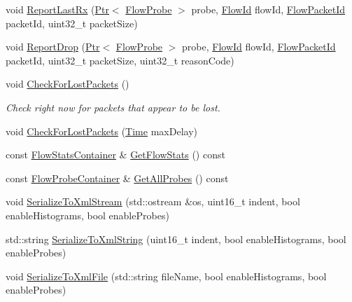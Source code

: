 \begin{DoxyCompactItemize}
\item 
void \hyperlink{classns3_1_1FlowMonitor_a534535fd498067cae4f774ba701e5d47}{Report\+Last\+Rx} (\hyperlink{classns3_1_1Ptr}{Ptr}$<$ \hyperlink{classns3_1_1FlowProbe}{Flow\+Probe} $>$ probe, \hyperlink{group__flow-monitor_ga39a766c4a370cdb9ab8ac85da4b288e9}{Flow\+Id} flow\+Id, \hyperlink{group__flow-monitor_gaa1cb18250e1672975204f1254b8aa2ae}{Flow\+Packet\+Id} packet\+Id, uint32\+\_\+t packet\+Size)
\item 
void \hyperlink{classns3_1_1FlowMonitor_af14d59ab4f3cc4f2b27601fca54cb7dd}{Report\+Drop} (\hyperlink{classns3_1_1Ptr}{Ptr}$<$ \hyperlink{classns3_1_1FlowProbe}{Flow\+Probe} $>$ probe, \hyperlink{group__flow-monitor_ga39a766c4a370cdb9ab8ac85da4b288e9}{Flow\+Id} flow\+Id, \hyperlink{group__flow-monitor_gaa1cb18250e1672975204f1254b8aa2ae}{Flow\+Packet\+Id} packet\+Id, uint32\+\_\+t packet\+Size, uint32\+\_\+t reason\+Code)
\item 
void \hyperlink{classns3_1_1FlowMonitor_a278237eb8464a95047b23144b90eb264}{Check\+For\+Lost\+Packets} ()
\begin{DoxyCompactList}\small\item\em Check right now for packets that appear to be lost. \end{DoxyCompactList}\item 
void \hyperlink{classns3_1_1FlowMonitor_ab230cce857030142abf2ac1d2143e9dc}{Check\+For\+Lost\+Packets} (\hyperlink{classns3_1_1Time}{Time} max\+Delay)
\item 
const \hyperlink{classns3_1_1FlowMonitor_a6dc86073dee117ed141b8871990c074f}{Flow\+Stats\+Container} \& \hyperlink{classns3_1_1FlowMonitor_ad4213086ef77531cc3a23e6c728fe2ab}{Get\+Flow\+Stats} () const 
\item 
const \hyperlink{classns3_1_1FlowMonitor_a35214d6743fdb20acd43eff946b2050d}{Flow\+Probe\+Container} \& \hyperlink{classns3_1_1FlowMonitor_a5163c8f1663d07b148cd048dd860f5ea}{Get\+All\+Probes} () const 
\item 
void \hyperlink{classns3_1_1FlowMonitor_ad710bde80a3f6a74c649df72200a0566}{Serialize\+To\+Xml\+Stream} (std\+::ostream \&os, uint16\+\_\+t indent, bool enable\+Histograms, bool enable\+Probes)
\item 
std\+::string \hyperlink{classns3_1_1FlowMonitor_a89647ad4d5e51d4c64c3dd655e420d4e}{Serialize\+To\+Xml\+String} (uint16\+\_\+t indent, bool enable\+Histograms, bool enable\+Probes)
\item 
void \hyperlink{classns3_1_1FlowMonitor_a4c92ccb32c95122857aefbcfc82d6746}{Serialize\+To\+Xml\+File} (std\+::string file\+Name, bool enable\+Histograms, bool enable\+Probes)
\end{DoxyCompactItemize}
